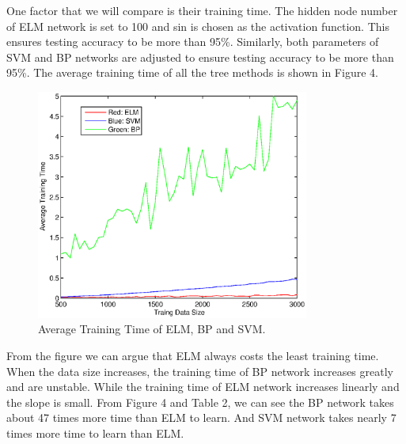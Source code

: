 \documentclass{elsart}
\begin{document}
One factor that we will compare is their training time.
The hidden node number of ELM network is set to 100 and sin is chosen as the activation function.
This ensures testing accuracy to be more than 95\%.
Similarly, both parameters of SVM and BP networks are adjusted to ensure testing accuracy to be more than 95\%.
The average training time of all the tree methods is shown in Figure 4.
\begin{figure}[H]
\begin{center}
\includegraphics[width=0.8\textwidth]{tt.eps}
\caption{Average Training Time of ELM, BP and SVM. }
\label{method}
\end{center}
\end{figure}
\par

From the figure we can argue that ELM always costs the least training time.
When the data size increases, the training time of BP network increases greatly and are unstable.
While the training time of ELM network increases linearly and the slope is small.
From Figure 4 and Table 2, we can see the BP network takes about 47 times more time than ELM to learn. 
And SVM network takes nearly 7 times more time to learn than ELM.
\par
\end{document}
